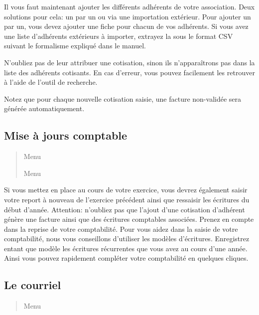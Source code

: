 \documentclass[a4paper,10pt,oneside,french]{sphinxmanual}
\begin{document}
Il vous faut maintenant ajouter les différents adhérents de votre association.
Deux solutions pour cela: un par un ou via une importation extérieur.
Pour ajouter un par un, vous devez ajouter une fiche pour chacun de vos adhérents.
Si vous avez une liste d’adhérents extérieurs à importer, extrayez la sous le format CSV suivant le formalisme expliqué dans le manuel.

N’oubliez pas de leur attribuer une cotisation, sinon ils n’apparaîtrons pas dans la liste des adhérents cotisants.
En cas d’erreur, vous pouvez facilement les retrouver à l’aide de l’outil de recherche.

Notez que pour chaque nouvelle cotisation saisie, une facture non-validée sera générée automatiquement.


\subsection{Mise à jours comptable}
\label{\detokenize{asso/first_step:mise-a-jours-comptable}}\begin{quote}

Menu 

Menu 
\end{quote}

Si vous mettez en place  au cours de votre exercice, vous devrez également saisir votre report à nouveau de l’exercice précédent ainsi que ressaisir les écritures du début d’année.
Attention: n’oubliez pas que l’ajout d’une cotisation d’adhérent génère une facture ainsi que des écritures comptables associées. Prenez en compte dans la reprise de votre comptabilité.
Pour vous aidez dans la saisie de votre comptabilité, nous vous conseillons d’utiliser les modèles d’écritures. Enregistrez entant que modèle les écritures récurrentes que vous avez au cours d’une année. Ainsi vous pouvez rapidement compléter votre comptabilité en quelques cliques.


\subsection{Le courriel}
\label{\detokenize{asso/first_step:le-courriel}}\begin{quote}

Menu 
\end{quote}
\end{document}
